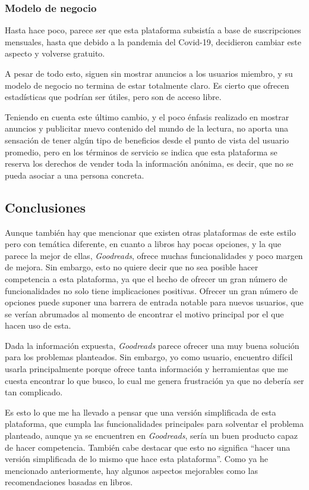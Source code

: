\subsubsection{Modelo de negocio}

Hasta hace poco, parece ser que esta plataforma subsistía a base de suscripciones mensuales, hasta que debido a la pandemia del Covid-19, decidieron cambiar este aspecto y volverse gratuito.

A pesar de todo esto, siguen sin mostrar anuncios a los usuarios miembro, y su modelo de negocio no termina de estar totalmente claro. Es cierto que ofrecen estadísticas que podrían ser útiles, pero son de acceso libre. 

Teniendo en cuenta este último cambio, y el poco énfasis realizado en mostrar anuncios y publicitar nuevo contenido del mundo de la lectura, no aporta una sensación de tener algún tipo de beneficios desde el punto de vista del usuario promedio, pero en los términos de servicio se indica que esta plataforma se reserva los derechos de vender toda la información anónima, es decir, que no se pueda asociar a una persona concreta.
 
\subsection{Conclusiones}

Aunque también hay que mencionar que existen otras plataformas de este estilo pero con temática diferente, en cuanto a libros hay pocas opciones, y la que parece la mejor de ellas, \textit{Goodreads}, ofrece muchas funcionalidades y poco margen de mejora. Sin embargo, esto no quiere decir que no sea posible hacer competencia a esta plataforma, ya que el hecho de ofrecer un gran número de funcionalidades no solo tiene implicaciones positivas. Ofrecer un gran número de opciones puede suponer una barrera de entrada notable para nuevos usuarios, que se verían abrumados al momento de encontrar el motivo principal por el que hacen uso de esta.

Dada la información expuesta, \textit{Goodreads} parece ofrecer una muy buena solución para los problemas planteados. Sin embargo, yo como usuario, encuentro difícil usarla principalmente porque ofrece tanta información y herramientas que me cuesta encontrar lo que busco, lo cual me genera frustración ya que no debería ser tan complicado. 

Es esto lo que me ha llevado a pensar que una versión simplificada de esta plataforma, que cumpla las funcionalidades principales para solventar el problema planteado, aunque ya se encuentren en \textit{Goodreads}, sería un buen producto capaz de hacer competencia. También cabe destacar que esto no significa ``hacer una versión simplificada de lo mismo que hace esta plataforma''. Como ya he mencionado anteriormente, hay algunos aspectos mejorables como las recomendaciones basadas en libros.

